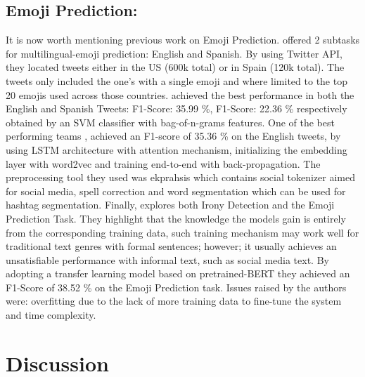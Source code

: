 \documentclass[11pt]{article}
\begin{document}
\subsection{Emoji Prediction:}
It is now worth mentioning previous work on Emoji Prediction. \cite{barbieri-etal-2018-semeval} offered 2 subtasks for multilingual-emoji prediction: English and Spanish. By using Twitter API,
they located tweets either in the US (600k total) or in Spain (120k total). The tweets only included the one's with a single emoji and where limited to the top 20 emojis used across those countries. \cite{Tubingen Olso} achieved 
the best performance in both the English and Spanish Tweets: F1-Score: 35.99 \%, F1-Score: 22.36 \% respectively obtained by an SVM classifier with bag-of-n-grams features. One of the best performing teams 
\cite{baziotis-etal-2018-ntua-slp}, achieved an F1-score of 35.36 \% on the English tweets, by using LSTM architecture with attention mechanism, initializing the embedding layer with word2vec and training end-to-end with back-propagation. 
The preprocessing tool they used was ekprahsis \cite{baziotis-etal-2017-datastories-semeval} which contains social tokenizer aimed for social media, spell correction and word segmentation which can be used for hashtag segmentation. Finally, \cite{towards understanding creatieve lang}
explores both Irony Detection and the Emoji Prediction Task. They highlight that the knowledge the models gain is entirely from the corresponding training data, such training mechanism may work well for traditional text genres with formal sentences; however; 
it usually achieves an unsatisfiable performance with informal text, such as social media text.  By adopting a transfer learning model based on pretrained-BERT they achieved an F1-Score of 38.52 \% on the Emoji Prediction task. Issues raised by the authors were: overfitting 
due to the lack of more training data to fine-tune the system and time complexity.  
\section{Discussion}
\label{sec:discussion}


%


\end{document}
